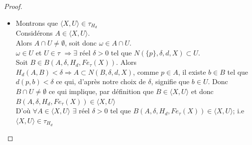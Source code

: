 \documentclass[11pt]{report}
\theoremstyle{styletheorem}
\theoremstyle{styledef}
\theoremstyle{remark}
\begin{document}
\begin{proof}
\begin{enumerate}
\begin{itemize}
				\item Montrons que $\langle X, U \rangle \in  \tau_{H_d} $\\
				Considérons $A \in \langle X, U \rangle$.
				\\  Alors $A \cap U \neq \emptyset$, soit donc $\omega  \in  A \cap U$.\\ $\omega \in U$ et $U \in \tau$ $\Rightarrow \exists$ réel $\delta > 0 $  tel que  $N(\lbrace p \rbrace, \delta, d, X) \subset U$.\\
				Soit $B \in B(A, \delta, H_d, Fe_\tau (X)).$ Alors $H_d (A, B)  < \delta \Rightarrow A \subset N(B, \delta, d, X) $, comme $p \in A$, il existe $b \in B$ tel que $d(p,b) < \delta$ ce qui, d'après notre choix de $\delta$, signifie que $b \in U$. Donc $B \cap U  \neq \emptyset$ ce qui implique, par définition que $B \in \langle X, U \rangle  $ et donc$B(A, \delta, H_d, Fe_\tau (X)) \in \langle X, U \rangle $ \\ D'où $\forall A \in \langle X, U \rangle$ $\exists$ réel $\delta > 0$ tel que $B(A, \delta, H_d, Fe_\tau (X)) \in \langle X, U \rangle$; i.e  $\langle X, U \rangle \in \tau_{H_d}$
			\end{itemize}
			

\end{enumerate}
\end{proof}
\end{document}
